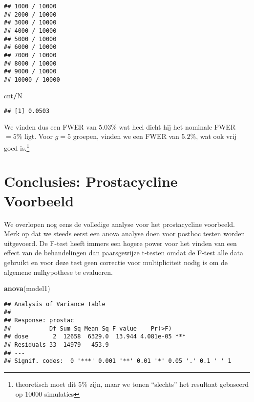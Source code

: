 \documentclass[
  12pt,dutch,coursenotes]{book}
\newenvironment{Shaded}{\begin{snugshade}}{\end{snugshade}}
\newcommand{\KeywordTok}[1]{\textcolor[rgb]{0.13,0.29,0.53}{\textbf{#1}}}
\newcommand{\NormalTok}[1]{#1}
\newcommand{\OperatorTok}[1]{\textcolor[rgb]{0.81,0.36,0.00}{\textbf{#1}}}
\theoremstyle{definition}
\theoremstyle{definition}
\theoremstyle{definition}
\theoremstyle{remark}
\begin{document}
\begin{verbatim}
## 1000 / 10000 
## 2000 / 10000 
## 3000 / 10000 
## 4000 / 10000 
## 5000 / 10000 
## 6000 / 10000 
## 7000 / 10000 
## 8000 / 10000 
## 9000 / 10000 
## 10000 / 10000
\end{verbatim}

\begin{Shaded}
\begin{Highlighting}[]
\NormalTok{cnt}\OperatorTok{/}\NormalTok{N}
\end{Highlighting}
\end{Shaded}

\begin{verbatim}
## [1] 0.0503
\end{verbatim}

We vinden dus een FWER van \(5.03\%\) wat heel dicht hij het nominale FWER\(=5\%\) ligt.
Voor \(g=5\) groepen, vinden we een FWER van \(5.2\%\), wat ook vrij goed is.\footnote{theoretisch moet dit \(5\%\) zijn, maar we tonen ``slechts'' het resultaat gebaseerd op 10000 simulaties}

\hypertarget{conclusies-prostacycline-voorbeeld}{%
\section{Conclusies: Prostacycline Voorbeeld}\label{conclusies-prostacycline-voorbeeld}}

We overlopen nog eens de volledige analyse voor het prostacycline voorbeeld.
Merk op dat we steeds eerst een anova analyse doen voor posthoc testen worden uitgevoerd.
De F-test heeft immers een hogere power voor het vinden van een effect van de behandelingen dan paarsgewijze t-testen omdat de F-test alle data gebruikt en voor deze test geen correctie voor multipliciteit nodig is om de algemene nulhypothese te evalueren.

\begin{Shaded}
\begin{Highlighting}[]
\KeywordTok{anova}\NormalTok{(model1)}
\end{Highlighting}
\end{Shaded}

\begin{verbatim}
## Analysis of Variance Table
## 
## Response: prostac
##           Df Sum Sq Mean Sq F value    Pr(>F)    
## dose       2  12658  6329.0  13.944 4.081e-05 ***
## Residuals 33  14979   453.9                      
## ---
## Signif. codes:  0 '***' 0.001 '**' 0.01 '*' 0.05 '.' 0.1 ' ' 1
\end{verbatim}
\end{document}
